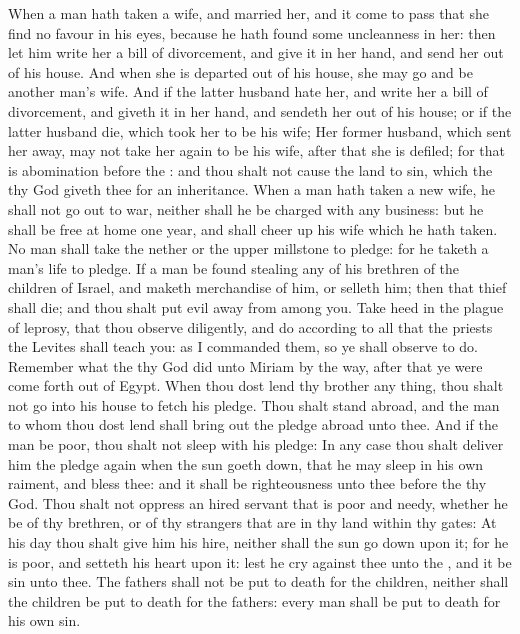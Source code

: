 \begin{biblechapter} %
\verse When a man hath taken a wife, and married her, and it come to pass that she find no favour in his eyes, because he hath found some uncleanness in her: then let him write her a bill of divorcement, and give it in her hand, and send her out of his house.
\verse And when she is departed out of his house, she may go and be another man's wife.
\verse And if the latter husband hate her, and write her a bill of divorcement, and giveth it in her hand, and sendeth her out of his house; or if the latter husband die, which took her to be his wife;
\verse Her former husband, which sent her away, may not take her again to be his wife, after that she is defiled; for that is abomination before the \LORD: and thou shalt not cause the land to sin, which the \LORD thy God giveth thee for an inheritance.
\verse When a man hath taken a new wife, he shall not go out to war, neither shall he be charged with any business: but he shall be free at home one year, and shall cheer up his wife which he hath taken.
\verse No man shall take the nether or the upper millstone to pledge: for he taketh a man's life to pledge.
\verse If a man be found stealing any of his brethren of the children of Israel, and maketh merchandise of him, or selleth him; then that thief shall die; and thou shalt put evil away from among you.
\verse Take heed in the plague of leprosy, that thou observe diligently, and do according to all that the priests the Levites shall teach you: as I commanded them, so ye shall observe to do.
\verse Remember what the \LORD thy God did unto Miriam by the way, after that ye were come forth out of Egypt.
\verse When thou dost lend thy brother any thing, thou shalt not go into his house to fetch his pledge.
\verse Thou shalt stand abroad, and the man to whom thou dost lend shall bring out the pledge abroad unto thee.
\verse And if the man be poor, thou shalt not sleep with his pledge:
\verse In any case thou shalt deliver him the pledge again when the sun goeth down, that he may sleep in his own raiment, and bless thee: and it shall be righteousness unto thee before the \LORD thy God.
\verse Thou shalt not oppress an hired servant that is poor and needy, whether he be of thy brethren, or of thy strangers that are in thy land within thy gates:
\verse At his day thou shalt give him his hire, neither shall the sun go down upon it; for he is poor, and setteth his heart upon it: lest he cry against thee unto the \LORD, and it be sin unto thee.
\verse The fathers shall not be put to death for the children, neither shall the children be put to death for the fathers: every man shall be put to death for his own sin.

\end{biblechapter}

